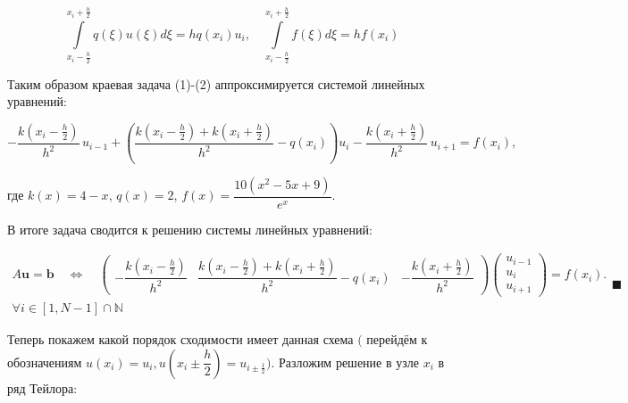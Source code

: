 \documentclass[a4paper,12pt]{article}
\begin{document}
	\begin{equation}
			\displaystyle\int\limits_{x_i - \frac{h}{2}}^{x_i+\frac{h}{2}} q(\xi)u(\xi) d\xi = hq(x_i) u_i ,  \quad \displaystyle\int\limits_{x_i - \frac{h}{2}}^{x_i+\frac{h}{2}} f(\xi) d\xi = h f(x_i) 
	\end{equation}
	
	\quad Таким образом краевая задача (1)-(2) аппроксимируется системой линейных уравнений:
	
	\begin{equation}
		-\frac{k\!\left(x_i - \frac{h}{2}\right)}{h^2}\,u_{i-1}
		+ \left( \frac{k\!\left(x_i - \frac{h}{2}\right) + k\!\left(x_i + \frac{h}{2}\right)}{h^2} - q(x_i) \right) u_i
		- \frac{k\!\left(x_i + \frac{h}{2}\right)}{h^2}\,u_{i+1}
		= f(x_i),
	\end{equation}
	
	\begin{center}
		где $k(x) = 4 - x$, $q(x) = 2$, $f(x) = \dfrac{10(x^2 - 5x + 9)}{e^x}$.
	\end{center}
	
	\quad В итоге задача сводится к решению системы линейных уравнений:
	
	\begin{equation}
		\begin{array}{c}
			A \mathbf{u} = \mathbf{b} \quad \Leftrightarrow \quad
			\begin{pmatrix}
				-\dfrac{k\!\left(x_i - \frac{h}{2}\right)}{h^2}
				& \dfrac{k\!\left(x_i - \frac{h}{2}\right) + k\!\left(x_i + \frac{h}{2}\right)}{h^2} - q(x_i)
				& -\dfrac{k\!\left(x_i + \frac{h}{2}\right)}{h^2}
			\end{pmatrix}
			\begin{pmatrix}
				u_{i-1} \\ u_i \\ u_{i+1}
			\end{pmatrix}
			= f(x_i). \\
			\forall i \in [1, N-1]\cap\mathbb{N}
		\end{array} \blacksquare
	\end{equation}
	
	\quad Теперь покажем какой порядок сходимости имеет данная схема $\bigg($ перейдём к обозначениям $u(x_i) = u_i, u\left(x_i \pm \dfrac{h}{2}\right) = u_{i \pm \frac{1}{2}}\bigg)$. Разложим решение в узле $x_i$ в ряд Тейлора: 
	
\end{document}
